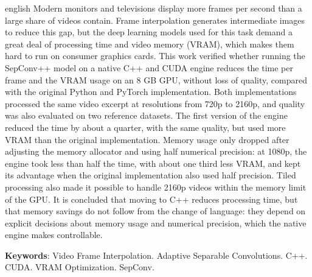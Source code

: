 \documentclass[
    12pt,                %
    openright,           %
    oneside,             %
    a4paper,             %
    english,             %
    brazil               %
]{abntex2}
\begin{document}
\begin{resumo}[Abstract]
 \begin{otherlanguage*}{english}
Modern monitors and televisions display more frames per second than a large share of videos contain. Frame interpolation generates intermediate images to reduce this gap, but the deep learning models used for this task demand a great deal of processing time and video memory (VRAM), which makes them hard to run on consumer graphics cards. This work verified whether running the SepConv++ model on a native C++ and CUDA engine reduces the time per frame and the VRAM usage on an 8 GB GPU, without loss of quality, compared with the original Python and PyTorch implementation. Both implementations processed the same video excerpt at resolutions from 720p to 2160p, and quality was also evaluated on two reference datasets. The first version of the engine reduced the time by about a quarter, with the same quality, but used more VRAM than the original implementation. Memory usage only dropped after adjusting the memory allocator and using half numerical precision: at 1080p, the engine took less than half the time, with about one third less VRAM, and kept its advantage when the original implementation also used half precision. Tiled processing also made it possible to handle 2160p videos within the memory limit of the GPU. It is concluded that moving to C++ reduces processing time, but that memory savings do not follow from the change of language: they depend on explicit decisions about memory usage and numerical precision, which the native engine makes controllable.

   \vspace{\onelineskip}

   \noindent
   \textbf{Keywords}: Video Frame Interpolation. Adaptive Separable Convolutions. C++. CUDA. VRAM Optimization. SepConv.
 \end{otherlanguage*}
\end{resumo}

\listoffigures*
\cleardoublepage

\listoftables*
\cleardoublepage

\end{document}
